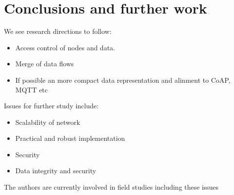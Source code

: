 \documentclass[conference, a4paper,10pt,twocolumn]{IEEEtran}
\begin{document}
\section{Conclusions and further work}
\label{sec:conclusion}

We see research directions to follow:

\begin{itemize}
\item Access control of nodes and data. 

\item Merge of data flows 

\item If possible an more compact data representation and alinment to CoAP, MQTT etc

\end{itemize}

Issues for further study include: 

\begin{itemize}
\item Scalability of network
\item Practical and robust implementation
\item Security
\item Data integrity and security

\end{itemize} 

The authors are currently involved in field studies including these issues
\end{document}
